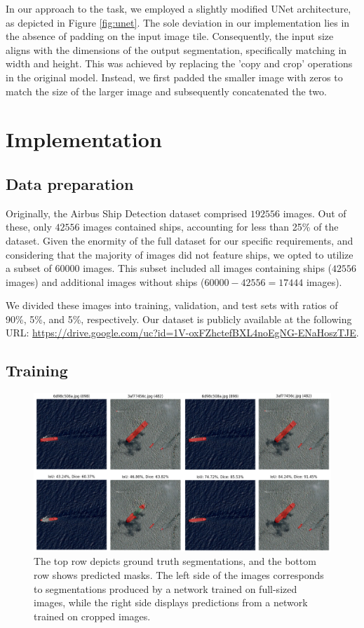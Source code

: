\documentclass{article}
\begin{document}
In our approach to the task, we employed a slightly modified UNet architecture, as depicted in Figure \ref{fig:unet}.
The sole deviation in our implementation lies in the absence of padding on the input image tile.
Consequently, the input size aligns with the dimensions of the output segmentation, specifically
matching in width and height. This was achieved by replacing the 'copy and crop' operations in
the original model. Instead, we first padded the smaller image with zeros to match the size of the larger
image and subsequently concatenated the two.


\section{Implementation}


\subsection{Data preparation}


Originally, the Airbus Ship Detection dataset comprised \(192556\) images. Out of these, only \(42556\) images contained
ships, accounting for less than 25\% of the dataset. Given the enormity of the full dataset for our specific requirements, 
and considering that the majority of images did not feature ships, we opted to utilize a subset of \(60000\) images. This
subset included all images containing ships (\(42556\) images) and additional images without ships (\(60000 - 42556 = 17444\) images).

We divided these images into training, validation, and test sets with ratios of 90\%, 5\%, and 5\%, respectively.
Our dataset is publicly available at the following URL: \url{https://drive.google.com/uc?id=1V-oxFZhctefBXL4noEgNG-ENaHoszTJE}.


\subsection{Training}


\begin{figure}[!ht]
  \centering
  \includegraphics[width=\textwidth]{comparison}
  \caption{
    The top row depicts ground truth
    segmentations, and the bottom row shows predicted masks. The left side of the
    images corresponds to segmentations produced by a network trained on full-sized
    images, while the right side displays predictions from a network trained
    on cropped images.
  }
  \label{fig:comparison}
\end{figure}
\end{document}
